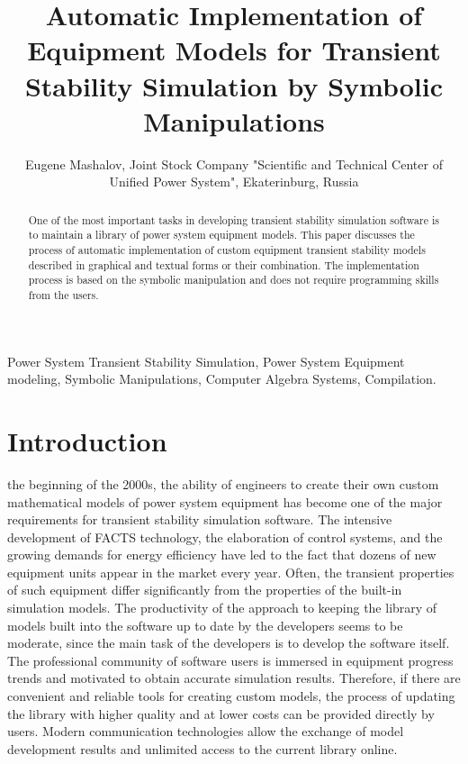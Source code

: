\documentclass[lettersize,journal]{IEEEtran}
\begin{document}
\title{Automatic Implementation of Equipment Models for Transient Stability Simulation by Symbolic Manipulations}

\author {Eugene Mashalov, Joint Stock Company "Scientific and Technical Center of Unified Power System", Ekaterinburg, Russia}




\maketitle

\begin{abstract}
One of the most important tasks in developing transient stability simulation software is to maintain a library of power system equipment models. 
This paper discusses the process of automatic implementation of custom equipment transient stability models described in graphical and textual forms or their combination. 
The implementation process is based on the symbolic manipulation and does not require programming skills from the users.
\end{abstract}

\begin{IEEEkeywords}
Power System Transient Stability Simulation, Power System Equipment modeling, Symbolic Manipulations, Computer Algebra Systems, Compilation.
\end{IEEEkeywords}

\section{Introduction}
 the beginning of the 2000s, the ability of engineers to create their own custom mathematical models of power system equipment 
has become one of the major requirements for transient stability simulation software. The intensive development of FACTS technology, 
the elaboration of control systems, and the growing demands for energy efficiency have led to the fact that dozens 
of new equipment units appear in the market every year. Often, the transient properties of such equipment differ significantly from the properties of 
the built-in simulation models. The productivity of the approach to keeping the library of models built into the software up to date by the developers 
seems to be moderate, since the main task of the developers is to develop the software itself. 
The professional community of software users is immersed in equipment progress trends and motivated to obtain accurate simulation results. 
Therefore, if there are convenient and reliable tools for creating custom models, the process of updating the library with higher quality and at lower costs 
can be provided directly by users. Modern communication technologies allow the exchange of model development results and unlimited access to the current library online.
\end{document}
